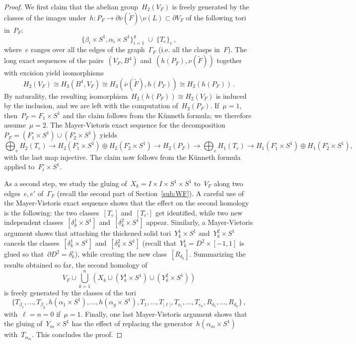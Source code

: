 \documentclass[10.9pt,a4paper]{amsart}
\theoremstyle{definition}
\theoremstyle{remark}
\newcommand{\onu}{\overline{\nu}}
\begin{document}
\begin{proof}
We first claim that the abelian group~$H_2(V_F)$ is freely generated by the classes of the images under~$h\colon P_F\to\partial \onu(\tilde{F}) \setminus \nu(L)\subset\partial V_F$ of the following tori in~$P_F$:
\[
\{\beta_i \times S^1,\alpha_i\times S^1\}_{i=1}^{g}\;\cup\; \{T_e\}_e\,,
\]
where~$e$ ranges over all the edges of the graph~$\Gamma_F$ (i.e. all the clasps in~$F$).
The long exact sequences of the pairs~$(V_F, B^4)$ and~$(h(P_F), \nu(\tilde F))$ together with excision yield isomorphisms
\[
H_2(V_F) \cong H_3(B^4, V_F) \cong H_3(\overline{\nu}(\tilde F), h(P_F)) \cong H_2(h(P_F))\,.
\]
By naturality, the resulting isomorphism~$H_2(h(P_F)) \cong H_2(V_F)$ is induced by the inclusion,
and we are left with the computation of~$H_2(P_F)$.
If~$\mu=1$, then~$P_F=F_1\times S^1$ and the claim follows from the K\"unneth formula; we therefore assume~$\mu=2$.
The Mayer-Vietoris exact sequence for the decomposition~$P_F = (F_1^\circ \times S^1) \cup (F_2^\circ \times S^1)$ yields
\[
\bigoplus_{e} H_2(T_e) \to H_2(F_1^\circ \times S^1) \oplus H_2(F_2^\circ \times S^1) \to H_2(P_F) \to \bigoplus_{e} H_1(T_e) \to H_1(F_1^\circ \times S^1) \oplus H_1(F_2^\circ \times S^1),
\]
with the last map injective.
The claim now follows from the K\"unneth formula applied to~$F_i^\circ\times S^1$.

As a second step, we study the gluing of~$X_k=I\times I\times S^1\times S^1$ to~$V_F$
along two edges~$e,e'$ of~$\Gamma_F$ (recall the second part of Section~\ref{sub:WF}).
A careful use of the Mayer-Vietoris exact sequence shows that the effect on the second homology is the following:
the two classes~$[T_e]$ and~$[T_{e'}]$ get identified, while two new independent classes~$[\delta_k^1\times S^1]$ and~$[\delta_k^2\times S^1]$ appear.
Similarly, a Mayer-Vietoris argument shows that attaching the thickened solid tori~$Y_k^1\times S^1$ and~$Y_k^2\times S^1$
cancels the classes~$[\delta_k^1\times S^1]$ and~$[\delta_k^2\times S^1]$ (recall that~$Y_k^i=D^2\times [-1,1]$ is glued so that~$\partial D^2=\delta_k^i$), while creating the new class~$[R_{\delta_k}]$.
Summarizing the results obtained so far, the second homology of
\[
 V_F\cup  \bigcup_{k=1}^n \left(X_k \cup (Y_k^1 \times S^1) \cup (Y_k^2 \times S^1)\right)
\]
is freely generated by the classes of the tori
\[
\{T_{\beta_1}, \ldots, T_{\beta_{g}}, h(\alpha_1\times S^1), \ldots, h(\alpha_{g}\times S^1), T_1, \ldots, T_{\vert\ell\vert}, T_{c_1}, \ldots, T_{c_n}, R_{\delta_1}, \ldots, R_{\delta_n}\}\,,
\]
with~$\ell=n=0$ if~$\mu=1$.
Finally, one last Mayer-Vietoris argument shows that the gluing of~$Y_m\times S^1$ has the effect of replacing
the generator~$h(\alpha_m\times S^1)$ with~$T_{\alpha_m}$. This concludes the proof.
\end{proof}
\end{document}
